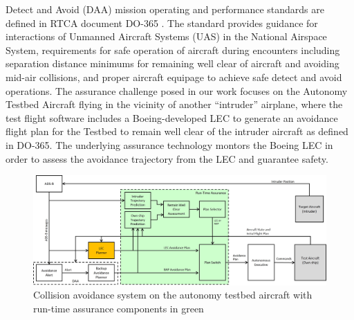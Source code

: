 Detect and Avoid (DAA) mission operating and performance standards are defined in RTCA document DO-365 \cite{DO_365}.  The standard provides guidance for interactions of Unmanned Aircraft Systems (UAS) in the National Airspace System, requirements for safe operation of aircraft during encounters including separation distance minimums for remaining well clear of aircraft and avoiding mid-air collisions, and proper aircraft equipage to achieve safe detect and avoid operations.
The assurance challenge posed in our work focuses on the Autonomy Testbed Aircraft flying in the vicinity of another ``intruder'' airplane, where the test flight software includes a Boeing-developed LEC to generate an avoidance flight plan for the Testbed to remain well clear of the intruder aircraft as defined in DO-365.  The underlying assurance technology montors the Boeing LEC in order to assess the avoidance trajectory from the LEC and guarantee safety. 

\begin{figure}
	\centering
	\includegraphics[width=\textwidth]{figures/rta-arch.jpg}
	\caption{Collision avoidance system on the autonomy testbed aircraft with run-time assurance components in green}
	\label{fig:rta-arch}
\end{figure}

